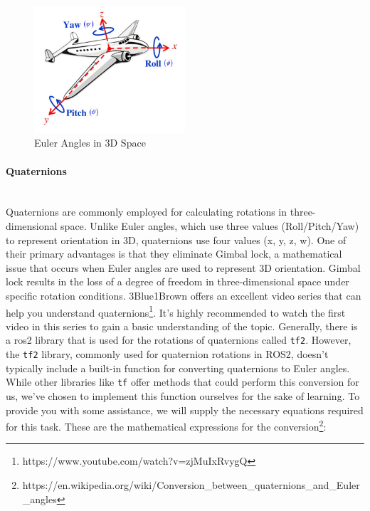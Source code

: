 \documentclass{article}
\begin{document}
\begin{figure}[H]
    \centering
    \includegraphics[width=0.5\textwidth]{img/Graphical-representation-of-Euler-angles-with-respect-to-the-reference-axis-of-the_W640.jpg}
    \caption[Euler Angles in 3D Space]{Euler Angles in 3D Space\footnotemark}
    \label{fig:euler_angles}
\end{figure}


\paragraph{Quaternions}~\\
Quaternions are commonly employed for calculating rotations in three-dimensional space. Unlike Euler angles, which use three values (Roll/Pitch/Yaw) to represent orientation in 3D, quaternions use four values (x, y, z, w). One of their primary advantages is that they eliminate Gimbal lock, a mathematical issue that occurs when Euler angles are used to represent 3D orientation. Gimbal lock results in the loss of a degree of freedom in three-dimensional space under specific rotation conditions.
3Blue1Brown offers an excellent video series that can help you understand quaternions\footnote{https://www.youtube.com/watch?v=zjMuIxRvygQ}. It's highly recommended to watch the first video in this series to gain a basic understanding of the topic. Generally, there is a ros2 library that is used for the rotations of quaternions called \texttt{tf2}. However, the \texttt{tf2} library, commonly used for quaternion rotations in ROS2, doesn't typically include a built-in function for converting quaternions to Euler angles. While other libraries like \texttt{tf} offer methods that could perform this conversion for us, we've chosen to implement this function ourselves for the sake of learning. To provide you with some assistance, we will supply the necessary equations required for this task. These are the mathematical expressions for the conversion\footnote{https://en.wikipedia.org/wiki/Conversion\_between\_quaternions\_and\_Euler\_angles}:
\end{document}
